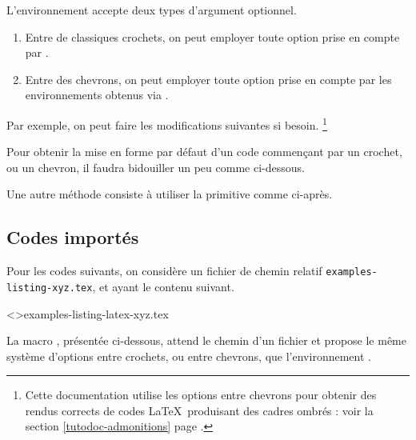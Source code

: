 \begin{tdocexa}[Personnaliser]
	L'environnement  accepte deux types d'argument optionnel.
	\begin{enumerate}
		\item Entre de classiques crochets, on peut employer toute option prise en compte par .

        \item Entre des chevrons, on peut employer toute option prise en compte par les environnements obtenus via .
	\end{enumerate}

	Par exemple, on peut faire les modifications suivantes si besoin.%
	\footnote{
		Cette documentation utilise les options entre chevrons pour obtenir des rendus corrects de codes \LaTeX\ produisant des cadres ombrés : voir la section \ref{tutodoc-admonitions} page \pageref{tutodoc-admonitions}.
	}

\end{tdocexa}

\medskip

\begin{tdocwarn}
    Pour obtenir la mise en forme par défaut d'un code commençant par un crochet, ou un chevron, il faudra bidouiller un peu comme ci-dessous.

    \smallskip

    Une autre méthode consiste à utiliser la primitive  comme ci-après.
\end{tdocwarn}


\subsection{Codes importés}

Pour les codes suivants, on considère un fichier de chemin relatif \verb+examples-listing-xyz.tex+, et ayant le contenu suivant.


\tdoclatexinput<>{examples-listing-latex-xyz.tex}


\medskip


La macro , présentée ci-dessous, attend le chemin d'un fichier et propose le même système d'options entre crochets, ou entre chevrons, que l'environnement .


